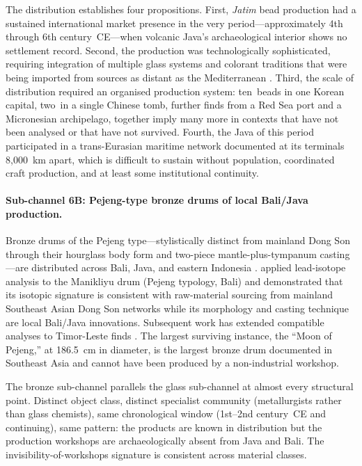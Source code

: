 \documentclass[12pt,a4paper]{article}
\begin{document}
The distribution establishes four propositions. First, \textit{Jatim} bead production had a sustained international market presence in the very period---approximately 4th through 6th century~CE---when volcanic Java's archaeological interior shows no settlement record. Second, the production was technologically sophisticated, requiring integration of multiple glass systems and colorant traditions that were being imported from sources as distant as the Mediterranean \citep{hoppal_etal_2023}. Third, the scale of distribution required an organised production system: ten~beads in one Korean capital, two~in a single Chinese tomb, further finds from a Red Sea port and a Micronesian archipelago, together imply many more in contexts that have not been analysed or that have not survived. Fourth, the Java of this period participated in a trans-Eurasian maritime network documented at its terminals 8{,}000~km apart, which is difficult to sustain without population, coordinated craft production, and at least some institutional continuity.

\paragraph{Sub-channel 6B: Pejeng-type bronze drums of local Bali/Java production.} Bronze drums of the Pejeng type---stylistically distinct from mainland Dong Son through their hourglass body form and two-piece mantle-plus-tympanum casting---are distributed across Bali, Java, and eastern Indonesia \citep{bernetkempers1988}. \citet{calo2014} applied lead-isotope analysis to the Manikliyu drum (Pejeng typology, Bali) and demonstrated that its isotopic signature is consistent with raw-material sourcing from mainland Southeast Asian Dong Son networks while its morphology and casting technique are local Bali/Java innovations. Subsequent work has extended compatible analyses to Timor-Leste finds \citep{calo2019}. The largest surviving instance, the ``Moon of Pejeng,'' at 186.5~cm in diameter, is the largest bronze drum documented in Southeast Asia and cannot have been produced by a non-industrial workshop.

The bronze sub-channel parallels the glass sub-channel at almost every structural point. Distinct object class, distinct specialist community (metallurgists rather than glass chemists), same chronological window (1st--2nd century~CE and continuing), same pattern: the products are known in distribution but the production workshops are archaeologically absent from Java and Bali. The invisibility-of-workshops signature is consistent across material classes.
\end{document}
